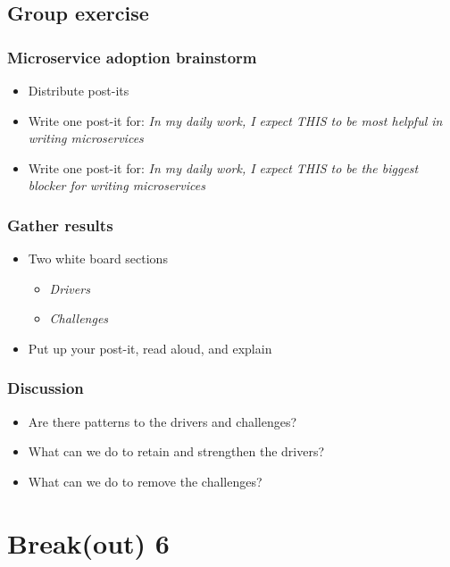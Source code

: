 \documentclass[8pt]{article}
\begin{document}
\subsection{Group exercise}
\label{sec:org628c122}
\subsubsection{Microservice adoption brainstorm}
\label{sec:orgc5bceee}
\begin{itemize}
\item Distribute post-its

\item Write one post-it for:
\emph{In my daily work, I expect THIS to be most helpful in writing microservices}

\item Write one post-it for:
\emph{In my daily work, I expect THIS to be the biggest blocker for writing microservices}
\end{itemize}

\subsubsection{Gather results}
\label{sec:orgd078618}
\begin{itemize}
\item Two white board sections
\begin{itemize}
\item \emph{Drivers}
\item \emph{Challenges}
\end{itemize}

\item Put up your post-it, read aloud, and explain
\end{itemize}
\subsubsection{Discussion}
\label{sec:orgbfa6f75}

\begin{itemize}
\item Are there patterns to the drivers and challenges?
\item What can we do to retain and strengthen the drivers?
\item What can we do to remove the challenges?
\end{itemize}
\section{Break(out) 6}
\label{sec:org282484c}
\end{document}

